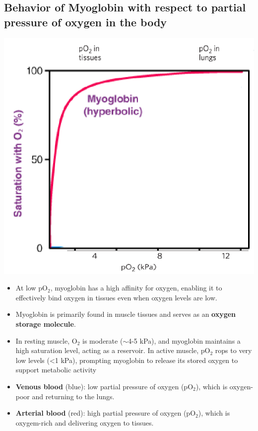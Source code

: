 \documentclass[10pt]{article}
\begin{document}
\subsection*{Behavior of Myoglobin with respect to partial pressure of oxygen in the body}
\begin{center}
    \includegraphics*[scale=0.8]{L2_10.png}
\end{center}
\begin{itemize}
    \item At low pO$_2$, myoglobin has a high affinity for oxygen, enabling it to effectively bind oxygen in tissues even when oxygen levels are low.
    \item Myoglobin is primarily found in muscle tissues and serves as an \textbf{oxygen storage molecule}.  
    \item In resting muscle, O$_2$ is moderate ($\sim$4-5 kPa), and myoglobin maintains a high saturation level, acting as a reservoir.  In active muscle, pO$_2$ rops to very low levels (<1 kPa), prompting myoglobin to release its stored oxygen to support metabolic activity
    \item \textbf{Venous blood} (blue): low partial pressure of oxygen (pO$_2$), which is oxygen-poor and returning to the lungs.
    \item \textbf{Arterial blood} (red): high partial pressure of oxygen (pO$_2$), which is oxygem-rich and delivering oxygen to tissues.
\end{itemize}
\end{document}
